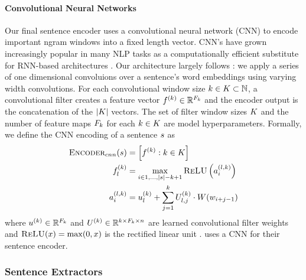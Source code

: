 \paragraph{Convolutional Neural Networks}
Our final sentence encoder uses a convolutional neural network
(CNN) to encode important ngram windows into a fixed length vector. 
CNN's have grown increasingly popular in many NLP tasks 
as a computationally efficient substitute for RNN-based architectures
\citep{kim2014convolutional,lei2015molding,dauphin2017language}.
Our architecture largely follows \cite{kim2014convolutional}: we apply a 
series of one dimensional convoluions over a sentence's word embeddings
using varying width convolutions. For each convolutional window size 
$k \in K \subset \mathbb{N}$, a convolutional filter creates 
a feature vector $f_{}^{( k )} \in \mathbb{R}^{F_k}$ 
and the encoder output is the concatenation of the $|K|$ vectors. 
The set of filter window sizes $K$ and the number of feature maps
$F_k$ for each $k \in K$ are 
model hyperparameters.
Formally, we define the CNN encoding of a sentence $s$ as 
\begin{align}
\textsc{Encoder}_{cnn}(s) & = \left[f_{}^{( k )} : k \in K \right]\\
f_{l}^{( k )} &= 
     \max_{i \in 1,\dots, |s| - k + 1} 
       \textsc{ReLU}\left(a^{(l,k)}_i \right) \\
a^{(l,k)}_i &= u^{(k)}_l
    + \sum^{k}_{j=1} U^{(k)}_{l,j} \cdot W(w_{i + j -1})
\end{align}
where $u^{(k)} \in \mathbb{R}^{F_k}$ and $U^{(k)} \in \mathbb{R}^{k \times F_k \times n}$
are learned convolutional filter weights and $\textsc{ReLU}(x) = \max(0, x)$ 
is the rectified linear unit \citep{nair2010rectified}. \cite{cheng2016neural}
uses a CNN for their sentence encoder.

\subsubsection{Sentence Extractors}

